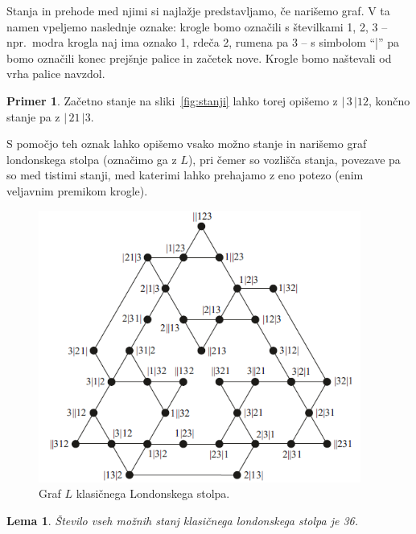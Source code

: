 \documentclass[12pt,a4paper]{amsart}
\theoremstyle{definition} %
\newtheorem{primer}[definicija]{Primer}
\theoremstyle{plain} %
\newtheorem{lema}[definicija]{Lema}
\newcommand{\bd}{\ensuremath{|\,}}
\newcommand{\ed}{\ensuremath{\,|}}
\begin{document}
Stanja in prehode med njimi si najlažje predstavljamo, če narišemo graf. V ta namen vpeljemo naslednje oznake:
krogle bomo označili s številkami 1, 2, 3 -- npr.\ modra krogla naj ima oznako 1, rdeča 2, rumena pa 3 -- s simbolom ``|'' pa bomo označili konec prejšnje palice in začetek nove. Krogle bomo naštevali od vrha palice navzdol.

\begin{primer}
    Začetno stanje na sliki~\ref{fig:stanji} lahko torej opišemo z $\bd 3 \ed 12$, končno stanje pa z $\bd 21 \ed 3$.
\end{primer}
\medskip

S pomočjo teh oznak lahko opišemo vsako možno stanje in narišemo graf londonskega stolpa (označimo ga z $L$), pri čemer so vozlišča stanja, povezave pa so med tistimi stanji, med katerimi lahko prehajamo z eno potezo (enim veljavnim premikom krogle).

\begin{figure}[h!]
    \includegraphics[width=300pt]{img/tolgraph.png}
    \caption{Graf $L$ klasičnega Londonskega stolpa.}
    \label{fig:tolgraph}
\end{figure}

\begin{lema}
    \label{lem:stanja-klas-lond}
    Število vseh možnih stanj klasičnega londonskega stolpa je 36.
\end{lema}
\end{document}
